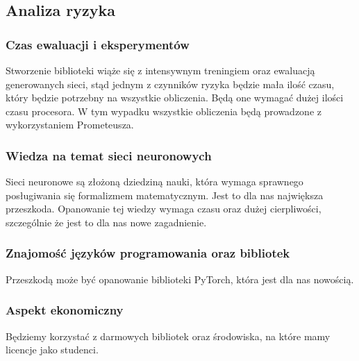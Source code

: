 \subsection{Analiza ryzyka}

\subsubsection{Czas ewaluacji i eksperymentów}
Stworzenie biblioteki wiąże się z intensywnym treningiem oraz ewaluacją
generowanych sieci, stąd jednym z czynników ryzyka będzie mała ilość czasu, który będzie potrzebny na wszystkie 
obliczenia. Będą one wymagać dużej ilości czasu procesora. W tym wypadku wszystkie obliczenia 
będą prowadzone z wykorzystaniem Prometeusza.

\subsubsection{Wiedza na temat sieci neuronowych}
Sieci neuronowe są złożoną dziedziną nauki, która wymaga sprawnego posługiwania się formalizmem matematycznym.
Jest to dla nas największa przeszkoda. Opanowanie tej wiedzy wymaga czasu oraz dużej cierpliwości, 
szczególnie że jest to dla nas nowe zagadnienie.

\subsubsection{Znajomość języków programowania oraz bibliotek }
Przeszkodą może być opanowanie biblioteki PyTorch, która jest dla nas nowością.

\subsubsection{Aspekt ekonomiczny }
Będziemy korzystać z darmowych bibliotek oraz środowiska, na które mamy licencje jako studenci.